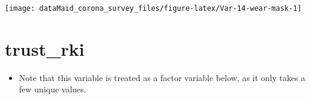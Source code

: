 \documentclass[
]{report}
\providecommand{\tightlist}{%
  \setlength{\itemsep}{0pt}\setlength{\parskip}{0pt}}
\begin{document}
\begin{minipage}{0.25 \textwidth}

\begin{center}\texttt{[image: dataMaid\_corona\_survey\_files/figure-latex/Var-14-wear-mask-1]} \end{center}

\end{minipage}

\noindent\makebox[\linewidth]{\rule{\textwidth}{0.4pt}}

\hypertarget{trust_rki}{%
\section{trust\_rki}\label{trust_rki}}

\begin{itemize}
\tightlist
\item
  Note that this variable is treated as a factor variable below, as it
  only takes a few unique values.
\end{itemize}
\end{document}
